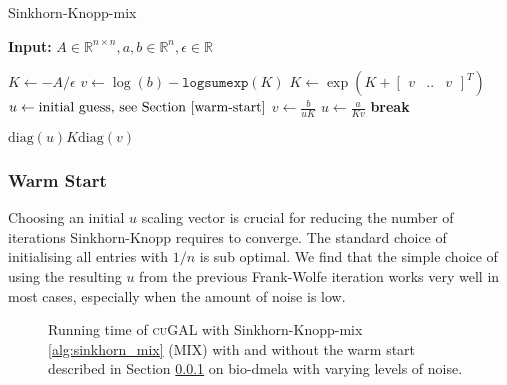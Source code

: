 \begin{algorithm}[H]
\caption{Sinkhorn-Knopp-mix}\label{alg:sinkhorn_mix}
\textbf{Input:} $A \in \mathds{R}^{n \times n}, a, b \in \mathds{R}^{n}, \epsilon \in \mathds{R}$
\begin{algorithmic}[1]
\State $K \gets -A / \epsilon$
\State $v \gets \log(b) - \texttt{logsumexp}(K)$
\State $K \gets \exp(K + \begin{bmatrix} v & .. & v \end{bmatrix}^T)$
\State $u \gets \text{initial guess, see Section \ref{warm-start}}$
    \State $v \gets \frac{b}{uK}$
    \State $u \gets \frac{a}{Kv}$
        \State \textbf{break}
    \EndIf
\EndFor

\State \Return $\text{diag}(u)K\text{diag}(v)$

\end{algorithmic}
\end{algorithm}

\subsubsection{Warm Start}\label{warm-start}
Choosing an initial $u$ scaling vector is crucial for reducing the number of iterations Sinkhorn-Knopp requires to converge. The standard choice of initialising all entries with $1/n$ is sub optimal. We find that the simple choice of using the resulting $u$ from the previous Frank-Wolfe iteration works very well in most cases, especially when the amount of noise is low.
\cache
\begin{figure}[H]
    \centering
    \caption{Running time of \textsc{cuGAL} with Sinkhorn-Knopp-mix \ref{alg:sinkhorn_mix} (MIX) with and without the warm start described in Section \ref{warm-start} on bio-dmela with varying levels of noise.}
    \label{fig:SK_accu}
\end{figure}


